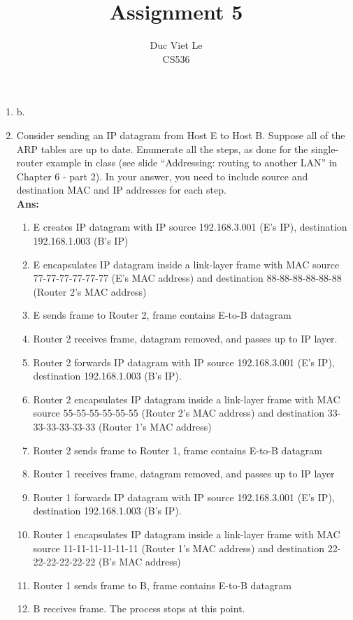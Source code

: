 \documentclass[11pt]{article}
\newenvironment{problem}[2][Problem]{\begin{trivlist}
\item[\hskip \labelsep {\bfseries #1}\hskip \labelsep {\bfseries #2.}]}{\end{trivlist}}
\begin{document}
\title{Assignment 5}
\author{Duc Viet Le\\ CS536}
\maketitle
\begin{problem}{1}
\end{problem}
\begin{enumerate}
	\item[a. ] b. 
	\pagebreak 
	\item[c. ]
	Consider sending an IP datagram from Host E to Host B. Suppose all of the ARP tables
	are up to date. Enumerate all the steps, as done for the single-router example in class
	(see slide “Addressing: routing to another LAN” in Chapter 6 - part 2). In your answer,
	you need to include source and destination MAC and IP addresses for each step.
	\\
	\textbf{Ans:}
	\begin{enumerate}
		\item[1.] E creates IP datagram with IP source 192.168.3.001 (E's IP), destination 192.168.1.003 (B's IP)
		\item[2.] E encapsulates IP datagram inside a link-layer frame with MAC source 77-77-77-77-77-77 (E's MAC address) and destination 88-88-88-88-88-88 (Router 2's MAC address)
		\item[3.] E sends frame to Router 2, frame contains E-to-B datagram
		\item[4.] Router 2 receives frame, datagram removed, and passes up to IP layer.
		\item[5.] Router 2 forwards IP datagram with IP source 192.168.3.001 (E's IP), destination 192.168.1.003 (B's IP).
		\item[6.] Router 2 encapsulates IP datagram inside a link-layer frame with MAC source 55-55-55-55-55-55 (Router 2's MAC address) and destination 33-33-33-33-33-33 (Router 1's MAC address)
		\item[7.] Router 2 sends frame to Router 1, frame contains E-to-B datagram
		\item[8.] Router 1 receives frame, datagram removed, and passes up to IP layer
		\item[9.] Router 1 forwards IP datagram with IP source 192.168.3.001 (E's IP), destination 192.168.1.003 (B's IP).
		\item[10.] Router 1 encapsulates IP datagram inside a link-layer frame with MAC source 11-11-11-11-11-11 (Router 1's MAC address) and destination 22-22-22-22-22-22 (B's MAC address)
		\item[11.] Router 1 sends frame to B, frame contains E-to-B datagram
		\item [12.] B receives frame. The process stops at this point.


\end{enumerate}
\end{enumerate}
\end{document}
